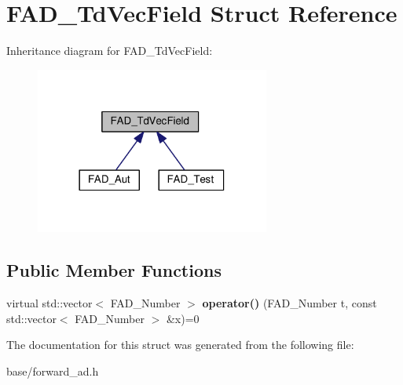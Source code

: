 \hypertarget{structFAD__TdVecField}{}\section{F\+A\+D\+\_\+\+Td\+Vec\+Field Struct Reference}
\label{structFAD__TdVecField}


Inheritance diagram for F\+A\+D\+\_\+\+Td\+Vec\+Field\+:\nopagebreak
\begin{figure}[H]
\begin{center}
\leavevmode
\includegraphics[width=218pt]{structFAD__TdVecField__inherit__graph}
\end{center}
\end{figure}
\subsection*{Public Member Functions}
\begin{DoxyCompactItemize}
\item 
\mbox{\label{structFAD__TdVecField_aff025280002bb1ed6699342e4b3e7a14}} 
virtual std\+::vector$<$ F\+A\+D\+\_\+\+Number $>$ {\bfseries operator()} (F\+A\+D\+\_\+\+Number t, const std\+::vector$<$ F\+A\+D\+\_\+\+Number $>$ \&x)=0
\end{DoxyCompactItemize}


The documentation for this struct was generated from the following file\+:\begin{DoxyCompactItemize}
\item 
base/forward\+\_\+ad.\+h\end{DoxyCompactItemize}
